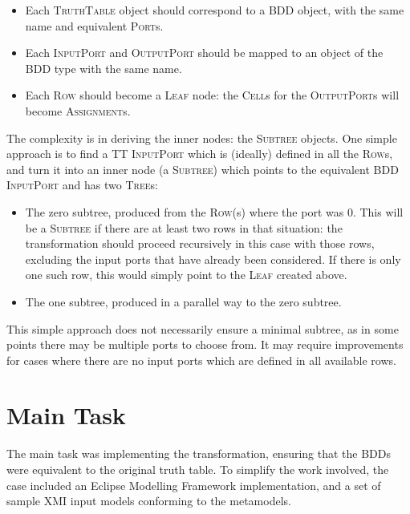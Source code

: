 \documentclass[a4paper]{article}
\newcommand*{\class}[1]{\textsc{#1}}
\begin{document}
\begin{itemize}
\item Each \class{TruthTable} object should correspond to a \class{BDD} object,
  with the same name and equivalent \class{Port}s.

\item Each \class{Input\-Port} and \class{Output\-Port} should be mapped to an
  object of the BDD type with the same name.

\item Each \class{Row} should become a \class{Leaf} node: the \class{Cell}s for
  the \class{Output\-Port}s will become \class{Assignment}s.
\end{itemize}

The complexity is in deriving the inner nodes: the \class{Subtree} objects. One
simple approach is to find a TT \class{Input\-Port} which is (ideally) defined
in all the \class{Row}s, and turn it into an inner node (a \class{Subtree})
which points to the equivalent BDD \class{Input\-Port} and has two
\class{Tree}s:
\begin{itemize}
\item The zero subtree, produced from the \class{Row}(s) where the port was 0.
  This will be a \class{Subtree} if there are at least two rows in that
  situation: the transformation should proceed recursively in this case with
  those rows, excluding the input ports that have already been considered. If
  there is only one such row, this would simply point to the \class{Leaf}
  created above.

\item The one subtree, produced in a parallel way to the zero subtree.
\end{itemize}

This simple approach does not necessarily ensure a minimal subtree, as in some
points there may be multiple ports to choose from. It may require improvements
for cases where there are no input ports which are defined in all available
rows.

\section{Main Task}
\label{sec:task-suggestions}

The main task was implementing the transformation, ensuring that the BDDs were
equivalent to the original truth table. To simplify the work involved, the case
included an Eclipse Modelling Framework implementation, and a set of sample XMI
input models conforming to the metamodels.
\end{document}
